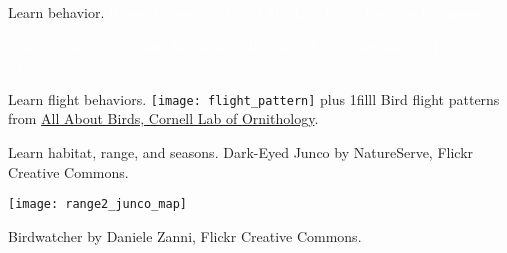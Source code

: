 \documentclass[t]{beamer}
\begin{document}
{
\begin{frame}[b,plain]{Learn behavior.}
	\tiny\hfill\textcolor{white}{Brown Creeper by David Mitchell, Flickr Creative Commons.}
\end{frame}
}

{
\begin{frame}[b,plain]{\hfill\textcolor{white}{Compare behavior.}}
	\tiny\textcolor{white}{White-Breasted Nuthatch by Matt MacGillivray, Flickr Creative Commons.}
\end{frame}
}

{
\begin{frame}[c,plain]{Learn flight behaviors.}
	\texttt{[image: flight\_pattern]}
\vskip0pt plus 1filll	
	\hfill\tiny Bird flight patterns from \href{http://allaboutbirds.com}{All About Birds, Cornell Lab of Ornithology}.
\end{frame}
}

{
\begin{frame}[b,plain]{Learn habitat, range, and seasons.}
	\tiny\hfill Dark-Eyed Junco by NatureServe, Flickr Creative Commons.
\end{frame}
}

\begin{frame}[b,plain]
	\begin{center}
		\texttt{[image: range2\_junco\_map]}
	\end{center}
\end{frame}

{
\begin{frame}[b,plain]
	\tiny Birdwatcher by Daniele Zanni, Flickr Creative Commons.
\end{frame}
}
\end{document}
